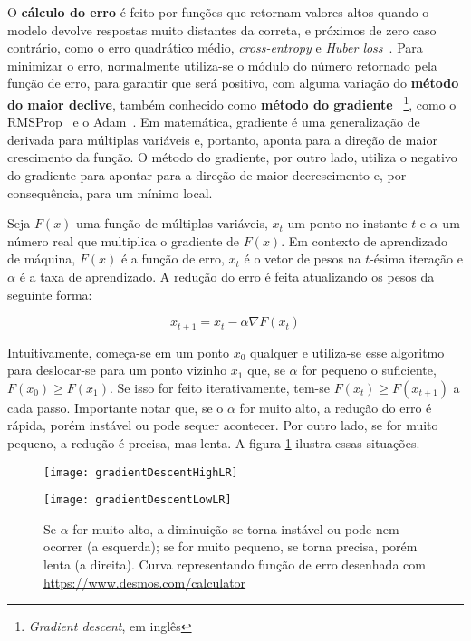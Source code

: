 O \textbf{cálculo do erro} é feito por funções que retornam valores altos quando o modelo devolve respostas muito distantes da correta, e próximos de zero caso contrário, como o erro quadrático médio, \textit{cross-entropy} e \textit{Huber loss}~\cite{huber_loss}.
Para minimizar o erro, normalmente utiliza-se o módulo do número retornado pela função de erro, para garantir que será positivo, com alguma variação do \textbf{método do maior declive}, também conhecido como \textbf{método do gradiente}~\cite{cauchy1847} \footnote{\textit{Gradient descent}, em inglês}, como o RMSProp~\cite{rmsprop} e o Adam~\cite{DBLP:journals/corr/KingmaB14}.
Em matemática, gradiente é uma generalização de derivada para múltiplas variáveis e, portanto, aponta para a direção de maior crescimento da função.
O método do gradiente, por outro lado, utiliza o negativo do gradiente para apontar para a direção de maior decrescimento e, por consequência, para um mínimo local.

Seja $F(x)$ uma função de múltiplas variáveis, $x_{t}$ um ponto no instante $t$ e $\alpha$ um número real que multiplica o gradiente de $F(x)$.
Em contexto de aprendizado de máquina, $F(x)$ é a função de erro, $x_{t}$ é o vetor de pesos na $t$-ésima iteração e $\alpha$ é a taxa de aprendizado.
A redução do erro é feita atualizando os pesos da seguinte forma:

\begin{equation} \label{eq:error_update}
x_{t+1} = x_{t} - \alpha \nabla F(x_{t})
\end{equation}

Intuitivamente, começa-se em um ponto $x_{0}$ qualquer e utiliza-se esse algoritmo para deslocar-se para um ponto vizinho $x_{1}$ que, se $\alpha$ for pequeno o suficiente, $F(x_{0}) \geq F(x_{1})$.
Se isso for feito iterativamente, tem-se $F(x_{t}) \geq F(x_{t+1})$ a cada passo.
Importante notar que, se o $\alpha$ for muito alto, a redução do erro é rápida, porém instável ou pode sequer acontecer.
Por outro lado, se for muito pequeno, a redução é precisa, mas lenta.
A figura \ref{fig:gradientDescent} ilustra essas situações.

\begin{figure}[h!]
  \begin{minipage}[b]{.45\textwidth}
  \centering
  \texttt{[image: gradientDescentHighLR]}
  \label{fig:gdhighlr}
  \end{minipage}
  \hfill
  \begin{minipage}[b]{.45\textwidth}
  \centering
  \texttt{[image: gradientDescentLowLR]}
  \label{fig:gdlowlr}
  \end{minipage}
  \caption{Se $\alpha$ for muito alto, a diminuição se torna instável ou pode nem ocorrer (a esquerda); se for muito pequeno, se torna precisa, porém lenta (a direita). Curva representando função de erro desenhada com \url{https://www.desmos.com/calculator}}
  \label{fig:gradientDescent}
\end{figure}

